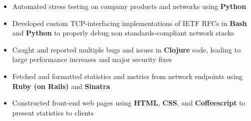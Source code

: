 \documentclass[10pt,letterpaper]{altacv}
\begin{document}

\begin{fullwidth}
\makecvheader
\end{fullwidth}



\begin{itemize}
    \item Automated stress testing on company products and networks using 
        \textbf{Python}
    \item Developed custom TCP-interfacing implementations of IETF RFCs in 
        \textbf{Bash} and \textbf{Python} to properly debug non 
        standards-compliant network stacks
    \item Caught and reported multiple bugs and issues in \textbf{Clojure} code, 
        leading to large performance increases and major security fixes
\end{itemize}

\divider

\begin{itemize}
    \item Fetched and formatted statistics and metrics from network endpoints 
        using \textbf{Ruby (on Rails)} and \textbf{Sinatra}
    \item Constructed front-end web pages using \textbf{HTML}, \textbf{CSS}, and 
        \textbf{Coffeescript} to present statistics to clients
\end{itemize}
\end{document}
